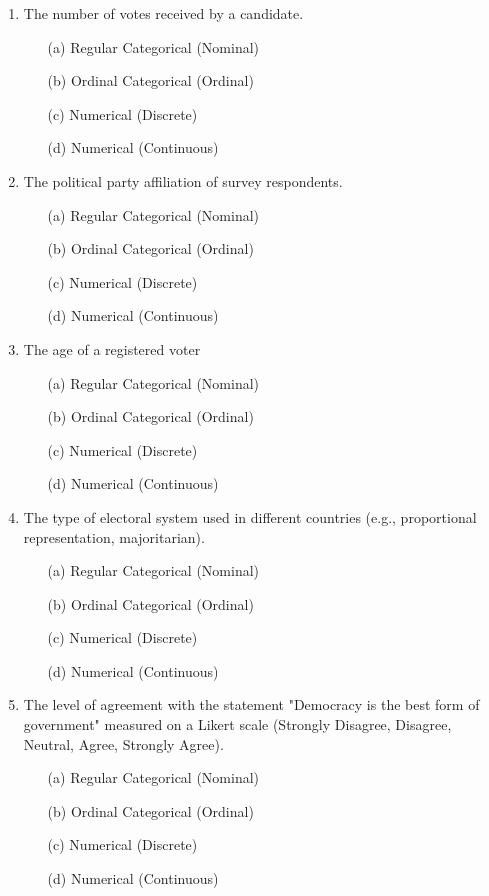 \documentclass{article}
\begin{document}
\begin{enumerate}
    \item The number of votes received by a candidate.
    \begin{itemize}
        \item[(a)] Regular Categorical (Nominal)
        \item[(b)] Ordinal Categorical (Ordinal)
        \item[(c)] Numerical (Discrete)
        \item[(d)] Numerical (Continuous)
    \end{itemize}

    \item The political party affiliation of survey respondents.
    \begin{itemize}
        \item[(a)] Regular Categorical (Nominal)
        \item[(b)] Ordinal Categorical (Ordinal)
        \item[(c)] Numerical (Discrete)
        \item[(d)] Numerical (Continuous)
    \end{itemize}

    \item The age of a registered voter
    \begin{itemize}
        \item[(a)] Regular Categorical (Nominal)
        \item[(b)] Ordinal Categorical (Ordinal)
        \item[(c)] Numerical (Discrete)
        \item[(d)] Numerical (Continuous)
    \end{itemize}

    \item The type of electoral system used in different countries (e.g., proportional representation, majoritarian).
    \begin{itemize}
        \item[(a)] Regular Categorical (Nominal)
        \item[(b)] Ordinal Categorical (Ordinal)
        \item[(c)] Numerical (Discrete)
        \item[(d)] Numerical (Continuous)
    \end{itemize}

    \item The level of agreement with the statement "Democracy is the best form of government" measured on a Likert scale (Strongly Disagree, Disagree, Neutral, Agree, Strongly Agree).
    \begin{itemize}
        \item[(a)] Regular Categorical (Nominal)
        \item[(b)] Ordinal Categorical (Ordinal)
        \item[(c)] Numerical (Discrete)
        \item[(d)] Numerical (Continuous)
    \end{itemize}


\end{enumerate}
\end{document}
